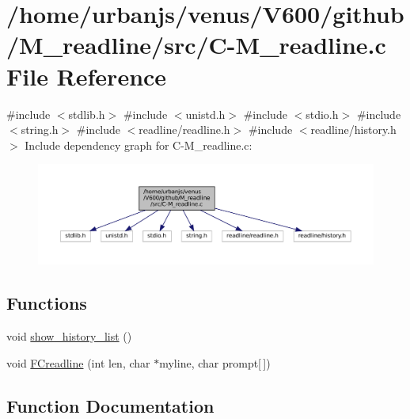 \hypertarget{C-M__readline_8c}{}\section{/home/urbanjs/venus/\+V600/github/\+M\+\_\+readline/src/\+C-\/\+M\+\_\+readline.c File Reference}
\label{C-M__readline_8c}
{\ttfamily \#include $<$stdlib.\+h$>$}\newline
{\ttfamily \#include $<$unistd.\+h$>$}\newline
{\ttfamily \#include $<$stdio.\+h$>$}\newline
{\ttfamily \#include $<$string.\+h$>$}\newline
{\ttfamily \#include $<$readline/readline.\+h$>$}\newline
{\ttfamily \#include $<$readline/history.\+h$>$}\newline
Include dependency graph for C-\/\+M\+\_\+readline.c\+:\nopagebreak
\begin{figure}[H]
\begin{center}
\leavevmode
\includegraphics[width=350pt]{C-M__readline_8c__incl}
\end{center}
\end{figure}
\subsection*{Functions}
\begin{DoxyCompactItemize}
\item 
void \mbox{\hyperlink{C-M__readline_8c_a80269900528c2ee04bf7cacb3a07ff40}{show\+\_\+history\+\_\+list}} ()
\item 
void \mbox{\hyperlink{C-M__readline_8c_a146edc06a54e833494378446131c6bcd}{F\+Creadline}} (int len, char $\ast$myline, char prompt\mbox{[}$\,$\mbox{]})
\end{DoxyCompactItemize}


\subsection{Function Documentation}
\mbox{\label{C-M__readline_8c_a146edc06a54e833494378446131c6bcd}} 
